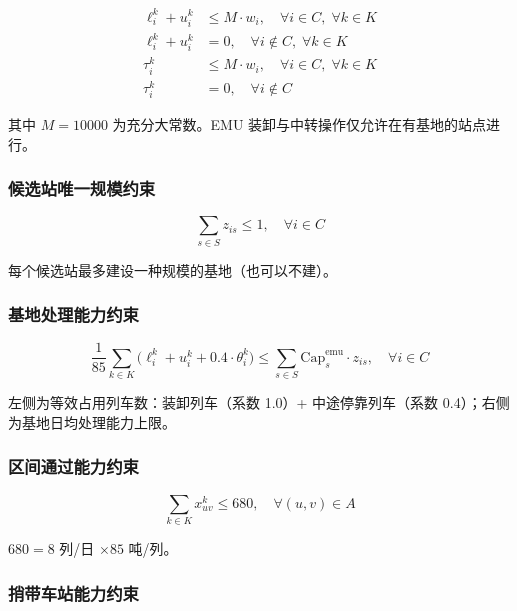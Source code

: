 \documentclass[12pt,a4paper,fontset=none]{ctexart}
\begin{document}
\begin{align}
\ell_i^k + u_i^k &\le M \cdot w_i, \quad \forall i\in C,\; \forall k\in K \label{eq:base_ops} \\
\ell_i^k + u_i^k &= 0, \quad \forall i\notin C,\; \forall k\in K \label{eq:no_emu_nonbase} \\
\tau_i^k &\le M \cdot w_i, \quad \forall i\in C,\; \forall k\in K \\
\tau_i^k &= 0, \quad \forall i\notin C
\end{align}

其中 $M = 10000$ 为充分大常数。EMU 装卸与中转操作仅允许在有基地的站点进行。

\subsubsection{候选站唯一规模约束}

\begin{equation}
\sum_{s\in S} z_{is} \le 1, \quad \forall i\in C \label{eq:one_scale}
\end{equation}

每个候选站最多建设一种规模的基地（也可以不建）。

\subsubsection{基地处理能力约束}

\begin{equation}
\frac{1}{85}\sum_{k\in K}\Big(\ell_i^k + u_i^k + 0.4\cdot\theta_i^k\Big) \le \sum_{s\in S} \text{Cap}_s^{\text{emu}} \cdot z_{is}, \quad \forall i\in C \label{eq:base_cap}
\end{equation}

左侧为等效占用列车数：装卸列车（系数 1.0）+ 中途停靠列车（系数 0.4）；右侧为基地日均处理能力上限。

\subsubsection{区间通过能力约束}

\begin{equation}
\sum_{k\in K} x_{uv}^k \le 680, \quad \forall (u,v)\in A \label{eq:edge_cap}
\end{equation}

$680 = 8$ 列/日 $\times 85$ 吨/列。

\subsubsection{捎带车站能力约束}
\end{document}
